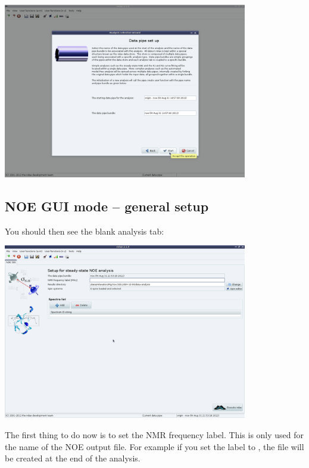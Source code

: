 \begin{minipage}[h]{\linewidth}
\centerline{\includegraphics[width=0.8\textwidth, bb=14 14 1415 1019]{graphics/screenshots/noe_analysis/analysis_wizard2}}
\end{minipage}



\subsection{NOE GUI mode -- general setup}

You should then see the blank analysis tab:

\begin{minipage}[h]{\linewidth}
\centerline{\includegraphics[width=0.8\textwidth, bb=14 14 1415 1019]{graphics/screenshots/noe_analysis/blank}}
\end{minipage}

The first thing to do now is to set the NMR frequency label.  This is only used for the name of the NOE output file.  For example if you set the label to , the file  will be created at the end of the analysis.

